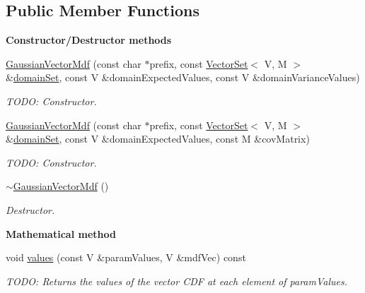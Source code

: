 \subsection*{Public Member Functions}
\begin{Indent}{\bf Constructor/\-Destructor methods}\par
\begin{DoxyCompactItemize}
\item 
\hyperlink{class_q_u_e_s_o_1_1_gaussian_vector_mdf_a015d3be8f9b52f811cd643294b6f1239}{Gaussian\-Vector\-Mdf} (const char $\ast$prefix, const \hyperlink{class_q_u_e_s_o_1_1_vector_set}{Vector\-Set}$<$ V, M $>$ \&\hyperlink{class_q_u_e_s_o_1_1_base_vector_mdf_ab060724f092b6623df50c0d0d725174c}{domain\-Set}, const V \&domain\-Expected\-Values, const V \&domain\-Variance\-Values)
\begin{DoxyCompactList}\small\item\em T\-O\-D\-O\-: Constructor. \end{DoxyCompactList}\item 
\hyperlink{class_q_u_e_s_o_1_1_gaussian_vector_mdf_ae378d6cb9cf8db82e72744ca38f385e5}{Gaussian\-Vector\-Mdf} (const char $\ast$prefix, const \hyperlink{class_q_u_e_s_o_1_1_vector_set}{Vector\-Set}$<$ V, M $>$ \&\hyperlink{class_q_u_e_s_o_1_1_base_vector_mdf_ab060724f092b6623df50c0d0d725174c}{domain\-Set}, const V \&domain\-Expected\-Values, const M \&cov\-Matrix)
\begin{DoxyCompactList}\small\item\em T\-O\-D\-O\-: Constructor. \end{DoxyCompactList}\item 
\hyperlink{class_q_u_e_s_o_1_1_gaussian_vector_mdf_afe3ec2c44fa9c133e825cecd29c1664c}{$\sim$\-Gaussian\-Vector\-Mdf} ()
\begin{DoxyCompactList}\small\item\em Destructor. \end{DoxyCompactList}\end{DoxyCompactItemize}
\end{Indent}
\begin{Indent}{\bf Mathematical method}\par
\begin{DoxyCompactItemize}
\item 
void \hyperlink{class_q_u_e_s_o_1_1_gaussian_vector_mdf_a4b842d80858175ead566bd57aa334c0a}{values} (const V \&param\-Values, V \&mdf\-Vec) const 
\begin{DoxyCompactList}\small\item\em T\-O\-D\-O\-: Returns the values of the vector C\-D\-F at each element of {\ttfamily param\-Values}. \end{DoxyCompactList}\end{DoxyCompactItemize}
\end{Indent}
